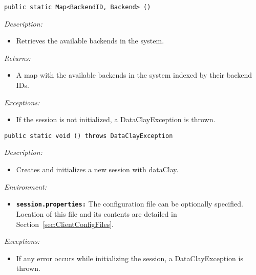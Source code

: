 
\begin{dBox}
\label{call:JavaGetBackends}
\texttt{public static Map<BackendID, Backend> () }
\LINE

{\it Description:}

\begin{itemize}
    \item Retrieves the available backends in the system.
\end{itemize}
 
{\it Returns:}

\begin{itemize}
    \item A map with the available backends in the system indexed by their backend IDs.
\end{itemize}

{\it Exceptions:}

\begin{itemize}
    \item If the session is not initialized, a DataClayException is thrown.
\end{itemize}

\end{dBox}



\begin{dBox}
\texttt{public static void () throws DataClayException}
\LINE

{\it Description:}

\begin{itemize}
    \item Creates and initializes a new session with dataClay.
\end{itemize}

{\it Environment:}

\begin{itemize}
    \item \texttt{\bfseries session.properties:} The configuration file can be optionally specified. Location of this file and its contents are detailed in Section~\ref{sec:ClientConfigFiles}.
\end{itemize}

{\it Exceptions:}

\begin{itemize}
    \item If any error occurs while initializing the session, a DataClayException is thrown.
\end{itemize}
 
\end{dBox}


